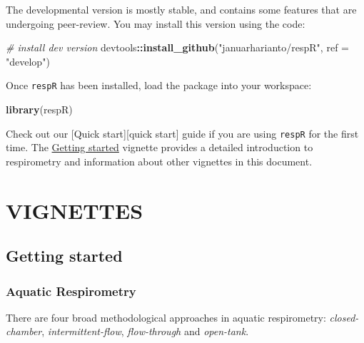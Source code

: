 \documentclass[]{book}
\newenvironment{Shaded}{\begin{snugshade}}{\end{snugshade}}
\newcommand{\KeywordTok}[1]{\textcolor[rgb]{0.13,0.29,0.53}{\textbf{#1}}}
\newcommand{\DataTypeTok}[1]{\textcolor[rgb]{0.13,0.29,0.53}{#1}}
\newcommand{\StringTok}[1]{\textcolor[rgb]{0.31,0.60,0.02}{#1}}
\newcommand{\CommentTok}[1]{\textcolor[rgb]{0.56,0.35,0.01}{\textit{#1}}}
\newcommand{\OperatorTok}[1]{\textcolor[rgb]{0.81,0.36,0.00}{\textbf{#1}}}
\newcommand{\NormalTok}[1]{#1}
\begin{document}
The developmental version is mostly stable, and contains some features
that are undergoing peer-review. You may install this version using the
code:

\begin{Shaded}
\begin{Highlighting}[]
\CommentTok{# install dev version}
\NormalTok{devtools}\OperatorTok{::}\KeywordTok{install_github}\NormalTok{(}\StringTok{"januarharianto/respR"}\NormalTok{, }\DataTypeTok{ref =} \StringTok{"develop"}\NormalTok{)}
\end{Highlighting}
\end{Shaded}

Once \texttt{respR} has been installed, load the package into your
workspace:

\begin{Shaded}
\begin{Highlighting}[]
\KeywordTok{library}\NormalTok{(respR)}
\end{Highlighting}
\end{Shaded}

Check out our {[}Quick start{]}{[}quick start{]} guide if you are using
\texttt{respR} for the first time. The
\protect\hyperlink{getting-started}{Getting started} vignette provides a
detailed introduction to respirometry and information about other
vignettes in this document.

\part*{VIGNETTES}\label{part-vignettes}

\hypertarget{getting-started}{\chapter{Getting
started}\label{getting-started}}

\section{Aquatic Respirometry}\label{aquatic-respirometry}

There are four broad methodological approaches in aquatic respirometry:
\emph{closed-chamber}, \emph{intermittent-flow}, \emph{flow-through} and
\emph{open-tank}.
\end{document}
